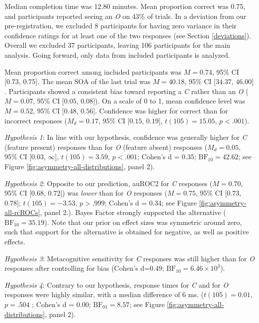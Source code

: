 \documentclass[12pt,twoside]{reedthesis}
\begin{document}
Median completion time was 12.80 minutes. Mean proportion correct was 0.75, and participants reported seeing an \emph{O} on 43\% of trials. In a deviation from our pre-registration, we excluded 8 participants for having zero variance in their confidence ratings for at least one of the two responses (see Section \ref{deviations}). Overall we excluded 37 participants, leaving 106 participants for the main analysis. Going forward, only data from included participants is analyzed.

Mean proportion correct among included participants was \(M = 0.74\), 95\% CI \([0.73\), \(0.75]\). The mean SOA of the last trial was \(M = 40.18\), 95\% CI \([34.37\), \(46.00]\). Participants showed a consistent bias toward reporting a \emph{C} rather than an \emph{O} (\(M = 0.07\), 95\% CI \([0.05\), \(0.08]\)). On a scale of 0 to 1, mean confidence level was \(M = 0.52\), 95\% CI \([0.48\), \(0.56]\). Confidence was higher for correct than for incorrect responses (\(M_d = 0.17\), 95\% CI \([0.15\), \(0.19]\), \(t(105) = 15.05\), \(p < .001\)).

\emph{Hypothesis 1}: In line with our hypothesis, confidence was generally higher for \emph{C} (feature present) responses than for \emph{O} (feature absent) responses (\(M_d = 0.05\), 95\% CI \([0.03\), \(\infty]\), \(t(105) = 3.59\), \(p < .001\); Cohen's d = 0.35; \(\mathrm{BF}_{\textrm{10}} = 42.62\); see Figure \ref{fig:asymmetry-all-distributions}, panel 2).

\emph{Hypothesis 2}: Opposite to our prediction, auROC2 for \emph{C} responses (\(M = 0.70\), 95\% CI \([0.68\), \(0.72]\)) was \emph{lower} than for \emph{O} responses (\(M = 0.75\), 95\% CI \([0.73\), \(0.78]\); \(t(105) = -3.53\), \(p > .999\); Cohen's d = 0.34; see Figure \ref{fig:asymmetry-all-rcROCs}, panel 2.). Bayes Factor strongly supported the alternative (\(\mathrm{BF}_{\textrm{10}} = 35.19\)). Note that our prior on effect sizes was symmetric around zero, such that support for the alternative is obtained for negative, as well as positive effects.

\emph{Hypothesis 3}: Metacognitive sensitivity for \emph{C} responses was still higher than for \emph{O} responses after controlling for bias (Cohen's d=0.49; \(\mathrm{BF}_{\textrm{10}} = 6.46 \times 10^{3}\)).

\emph{Hypothesis 4}: Contrary to our hypothesis, response times for \emph{C} and for \emph{O} responses were highly similar, with a median difference of 6 ms. (\(t(105) = 0.01\), \(p = .504\) ; Cohen's d = 0.00; \(\mathrm{BF}_{\textrm{01}} = 8.57\); see Figure \ref{fig:asymmetry-all-distributions}, panel 2).
\end{document}
